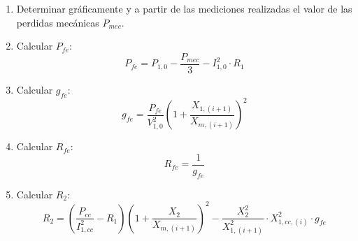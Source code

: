 \documentclass[11pt,letterpaper]{article}     %
\begin{document}
\begin{enumerate}
	\item Determinar gráficamente y a partir de las mediciones realizadas el valor de las perdidas mecánicas $P_{mec}$.
	\item Calcular $P_{fe}$:
	\begin{equation}
		P_{fe} = P_{1,0}-\frac{P_{mec}}{3}-I_{1,0}^{2}\cdot R_{1}
	\end{equation}
	\item Calcular $g_{fe}$:
	\begin{equation}
		g_{fe} = \frac{P_{fe}}{V_{1,0}^{2}}\left(1+\frac{X_{1,(i+1)}}{X_{m,(i+1)}}\right)^{2} \label{gfeequ}
	\end{equation} 
	\item Calcular $R_{fe}$:
	\begin{equation}
	R_{fe} = \frac{1}{g_{fe}}
	\end{equation}
	\item Calcular $R_{2}$:
	\begin{equation}
		R_{2} = \left(\frac{P_{cc}}{I_{1,cc}^{2}}-R_{1}\right)\left(1+\frac{X_{2}}{X_{m,(i+1)}}\right)^{2}-\frac{X_{2}^{2}}{X_{1,(i+1)}^{2}}\cdot X_{1,cc,(i)}^{2}\cdot g_{fe}
	\end{equation}
\end{enumerate}
\end{document}
